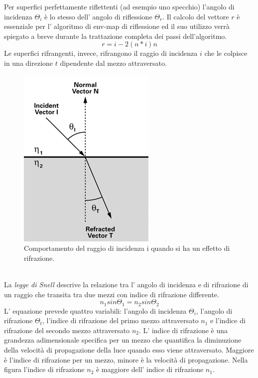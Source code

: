 Per superfici perfettamente riflettenti (ad esempio uno specchio) l’angolo di incidenza $\Theta_i$ è lo stesso dell’ angolo di riflessione $\Theta_r$.
Il calcolo del vettore $r$ è essenziale per l’ algoritmo di env-map di riflessione ed il suo utilizzo verrà spiegato a breve durante la trattazione completa dei passi dell’algoritmo.
\begin{equation}
r = i - 2(n * i)n 
\end{equation}
Le superfici rifrangenti, invece, rifrangono  il raggio di incidenza $i$ che le colpisce in una direzione $t$ dipendente dal mezzo attraversato.
\\
\begin{figure}[htb]
 \centering
 \includegraphics[width=0.4\linewidth]{images/chapter_stato_arte/stato_arte_refr.png}\hfill
 \caption[Env map: rifrazione]{Comportamento del raggio di incidenza i quando si ha un effetto di rifrazione.}
 \label{fig:stato_arte_refr}
\end{figure}
\\
La \emph{legge di Snell} \cite{env2} descrive la relazione tra l’ angolo di incidenza e di rifrazione di un raggio che transita tra due mezzi con indice di rifrazione differente.
\begin{equation}
n_1sin\Theta_1 = n_2sin\Theta_2 
\end{equation}
L’ equazione prevede quattro variabili: l’angolo di incidenza $\Theta_i$, l’angolo di rifrazione $\Theta_t$, l’indice di rifrazione del primo mezzo attraversato $n_1$ e l’indice di rifrazione del secondo mezzo attraversato $n_2$.
L’ indice di rifrazione è una grandezza adimensionale specifica per un mezzo che quantifica la diminuzione della velocità di propagazione della luce quando esso viene attraversato. Maggiore è l’indice di rifrazione per un mezzo, minore è la velocità di propagazione.
Nella figura l’indice di rifrazione $n_2$ è maggiore dell’ indice di rifrazione $n_1$. 
